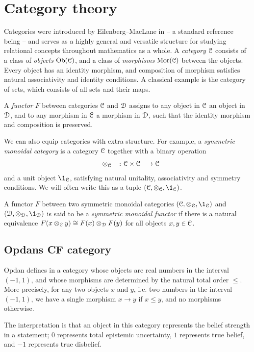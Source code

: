 

\section{Category theory}
Categories were introduced by Eilenberg--MacLane in \cite{eilenberg-maclane_1945} -- a standard reference being \cite{maclane_1998} -- and serves as a highly general and versatile structure for studying relational concepts throughout mathematics as a whole. A \emph{category} $\EuScript{C}$ consists of a class of \emph{objects} $\operatorname{Ob}(\EuScript{C})$, and a class of \emph{morphisms} $\operatorname{Mor}(\EuScript{C})$ between the objects. Every object has an identity morphism, and composition of morphism satisfies natural associativity and identity conditions. A classical example is the category of sets, which consists of all sets and their maps. 

A \emph{functor} $F$ between categories $\EuScript{C}$ and $\EuScript{D}$ assigns to any object in $\EuScript{C}$ an object in $\EuScript{D}$, and to any morphism in $\EuScript{C}$ a morphism in $\EuScript{D}$, such that the identity morphism and composition is preserved. 

We can also equip categories with extra structure. For example, a \emph{symmetric monoidal category} is a category $\EuScript{C}$ together with a binary operation 
\[-\otimes_{\EuScript{C}} - \colon \EuScript{C} \times \EuScript{C} \longrightarrow \EuScript{C}\] 
and a unit object $\1_\C$, satisfying natural unitality, associativity and symmetry conditions. We will often write this as a tuple $(\C, \otimes_\C, \1_\C)$. 

A functor $F$ between two symmetric monoidal categories $(\C, \otimes_\C, \1_\C)$ and $(\D, \otimes_\D, \1_\D)$ is said to be a \emph{symmetric monoidal functor} if there is a natural equivalence $F(x\otimes_{\EuScript{C}} y) \cong F(x)\otimes_{\EuScript{D}} F(y)$ for all objects $x,y \in \EuScript{C}$. 






\subsection{Opdans CF category}
Opdan defines in \cite{opdan_2025} a category whose objects are real numbers in the interval $(-1,1)$, and whose morphisms are determined by the natural total order $\leq$. More precisely, for any two objects $x$ and $y$, i.e. two numbers in the interval $(-1,1)$, we have a single morphism $x\to y$ if $x\leq y$, and no morphisms otherwise. 

The interpretation is that an object in this category represents the belief strength in a statement; $0$ represents total epistemic uncertainty, $1$ represents true belief, and $-1$ represents true disbelief.  

